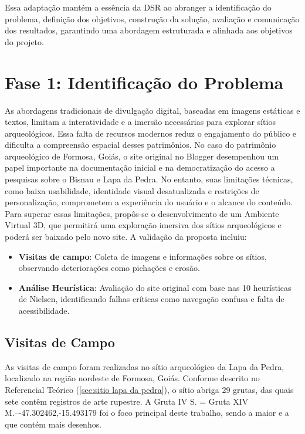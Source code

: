 Essa adaptação mantém a essência da DSR ao abranger a identificação do problema, definição dos objetivos, construção da solução, avaliação e comunicação dos resultados, garantindo uma abordagem estruturada e alinhada aos objetivos do projeto.

\section{Fase 1: Identificação do Problema}\label{definicao_do_problema}
As abordagens tradicionais de divulgação digital, baseadas em imagens estáticas e textos, limitam a interatividade e a imersão necessárias para explorar sítios arqueológicos. Essa falta de recursos modernos reduz o engajamento do público e dificulta a compreensão espacial desses patrimônios.
No caso do patrimônio arqueológico de Formosa, Goiás, o site original no Blogger desempenhou um papel importante na documentação inicial e na democratização do acesso a pesquisas sobre o Bisnau e Lapa da Pedra. No entanto, suas limitações técnicas, como baixa usabilidade, identidade visual desatualizada e restrições de personalização, comprometem a experiência do usuário e o alcance do conteúdo.
Para superar essas limitações, propôs-se o desenvolvimento de um Ambiente Virtual 3D, que permitirá uma exploração imersiva dos sítios arqueológicos e poderá ser baixado pelo novo site. A validação da proposta incluiu:

\begin{itemize}
\item \textbf{Visitas de campo}: Coleta de imagens e informações sobre os sítios, observando deteriorações como pichações e erosão.
\item \textbf{Análise Heurística}: Avaliação do site original com base nas 10 heurísticas de Nielsen, identificando falhas críticas como navegação confusa e falta de acessibilidade.
\end{itemize}

\subsection{Visitas de Campo}
As visitas de campo foram realizadas no sítio arqueológico da Lapa da Pedra, localizado na região nordeste de Formosa, Goiás. Conforme descrito no Referencial Teórico (\ref{sec:sitio lapa da pedra}), o sítio abriga 29 grutas, das quais sete contêm registros de arte rupestre. A Gruta IV S. = Gruta XIV M.–-47.302462,-15.493179 foi o foco principal deste trabalho, sendo a maior e a que contém mais desenhos.

